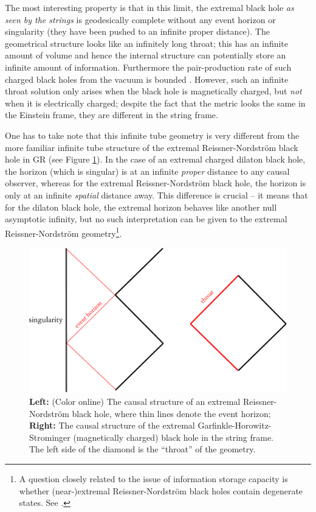 \documentclass[12pt]{article}
\newcommand{\2}{$^2$}
\newcommand{\3}{$^3$}
\newcommand{\4}{$_4$}
\newcommand{\5}{$_5$}
\begin{document}
The most interesting property is that in this limit, the extremal black hole \emph{as seen by the strings} is geodesically complete without any event horizon or singularity (they have been pushed to an infinite proper distance). The geometrical structure looks like an infinitely long throat; this has an infinite amount of volume and hence the internal structure can potentially store an infinite amount of information. Furthermore the pair-production rate of such charged black holes from the vacuum is bounded \cite{Banks:1992is}. However, such an infinite throat solution only arises when the black hole is magnetically charged, but \emph{not} when it is electrically charged; despite the fact that the metric looks the same in the Einstein frame, they are different in the string frame.

One has to take note that this infinite tube geometry is very different from the more familiar infinite tube structure of the extremal Reissner-Nordstr\"om black hole in GR (see Figure \ref{fig:extreme}). In the case of an extremal charged dilaton black hole, the horizon (which is singular) is at an infinite \emph{proper} distance to any causal observer, whereas for the extremal Reissner-Nordstr\"om black hole, the horizon is only at an infinite \emph{spatial} distance away. This difference is crucial -- it means that for the dilaton black hole, the extremal horizon behaves like another null asymptotic infinity, but no such interpretation can be given to the extremal Reissner-Nordstr\"om geometry\footnote{A question closely related to the issue of information storage capacity is whether (near-)extremal Reissner-Nordstr\"om black holes contain degenerate states. See \cite{0012020}.}. 

\begin{figure}
\begin{center}
\includegraphics[scale=0.6]{extreme-eps-converted-to.pdf}
\caption{\label{fig:extreme}\textbf{Left:} (Color online) The causal structure of an extremal Reissner-Nordstr\"om black hole, where thin lines denote the event horizon; \textbf{Right:} The causal structure of the extremal Garfinkle-Horowitz-Strominger (magnetically charged) black hole in the string frame. The left side of the diamond is the ``throat'' of the geometry.}
\end{center}
\end{figure}
\end{document}
